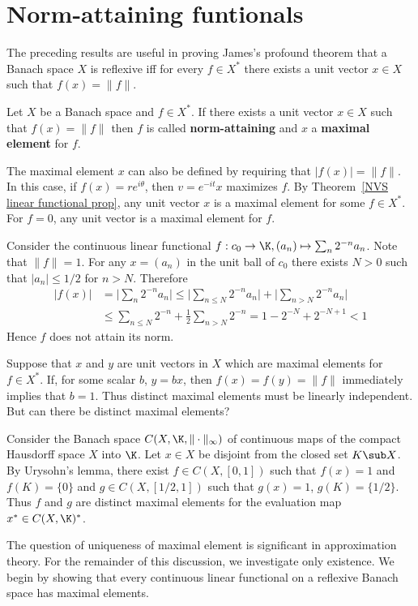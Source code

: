 \section{Norm-attaining funtionals}
The preceding results are useful in proving James's profound theorem that a Banach space $X$ is reflexive iff for every $f\in X^*$ there exists a unit vector $x\in X$ such that $f(x)=\|f\|$.
\begin{definition}
Let $X$ be a Banach space and $f\in X^*$. If there exists a unit vector $x\in X$ such that $f(x)=\|f\|$ then $f$ is called \textbf{norm-attaining} and $x$ a \textbf{maximal element} for $f$.
\end{definition}
The maximal element $x$ can also be defined by requiring that $|f(x)|=\|f\|$. In this case, if $f(x)=re^{i\theta}$, then $v=e^{-it}x$ maximizes $f$. By Theorem~\ref{NVS linear functional prop}, any unit vector $x$ is a maximal element for some $f\in X^*$. For $f=0$, any unit vector is a maximal element for $f$.
\begin{example}
Consider the continuous linear functional $f:c_0\to\K,(a_n)\mapsto\sum_n2^{-n}a_n$. Note that $\|f\|=1$. For any $x=(a_n)$ in the unit ball of $c_0$ there exists $N>0$ such that $|a_n|\leq 1/2$ for $n>N$. Therefore
\begin{align*}
|f(x)|&=\Big|\sum_n2^{-n}a_n\Big|\leq\Big|\sum_{n\leq N}2^{-n}a_n\Big|+\Big|\sum_{n>N}2^{-n}a_n\Big|\\
&\leq\sum_{n\leq N}2^{-n}+\frac{1}{2}\sum_{n>N}2^{-n}=1-2^{-N}+2^{-N+1}<1
\end{align*}
Hence $f$ does not attain its norm.
\end{example}
Suppose that $x$ and $y$ are unit vectors in $X$ which are maximal elements for $f\in X^*$. If, for some scalar $b$, $y=bx$, then $f(x)=f(y)=\|f\|$ immediately implies that $b=1$. Thus distinct maximal elements must be linearly independent. But can there be distinct maximal elements?
\begin{example}\label{c_0 norm not attaining}
Consider the Banach space $C(X,\K,\|\cdot\|_\infty)$ of continuous maps of the compact Hausdorff space $X$ into $\K$. Let $x\in X$ be disjoint from the closed set $K\sub X$. By Urysohn's lemma, there exist $f\in C(X,[0,1])$ such that $f(x)=1$ and $f(K)=\{0\}$ and $g\in C(X,[1/2,1])$ such that $g(x)=1$, $g(K)=\{1/2\}$. Thus $f$ and $g$ are distinct maximal elements for the evaluation map $x^*\in C(X,\K)^*$.
\end{example}
The question of uniqueness of maximal element is significant in approximation theory. For the remainder of this discussion, we investigate only existence. We begin by showing that every continuous linear functional on a reflexive Banach space has maximal elements.
